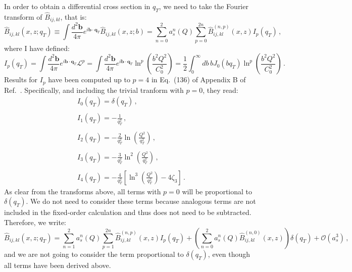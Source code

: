 \documentclass[10pt,a4paper]{article}
\begin{document}
In order to obtain a differential cross section in $q_T$, we need to
take the Fourier transform of $\hat{B}_{ij,kl}$, that is:
\begin{equation}
 \hat{B}_{ij,kl}(x,z;q_T) \equiv \int\frac{d^2\mathbf{b}}{4\pi} e^{i \mathbf{b}\cdot
  \mathbf{q}_T} \hat{B}_{ij,kl}(x,z;b) = \sum_{n=0}^2a_s^n(Q)\sum_{p=0}^{2n}\hat{B}_{ij,kl}^{(n,p)}(x,z) I_p(q_T)\,,
\end{equation}
where I have defined:
\begin{equation}
I_p(q_T) = \int\frac{d^2\mathbf{b}}{4\pi} e^{i \mathbf{b}\cdot
  \mathbf{q}_T}\mathcal{L}^p=\int\frac{d^2\mathbf{b}}{4\pi} e^{i \mathbf{b}\cdot
  \mathbf{q}_T}\ln^p\left(\frac{b^2Q^2}{C_0^2}\right) = \frac12\int_0^\infty db\,b J_0(bq_T) \ln^p\left(\frac{b^2Q^2}{C_0^2}\right)\,.
\end{equation}
Results for $I_p$ have been computed up to $p=4$ in Eq.~(136) of
Appendix B of Ref.~\cite{Bozzi:2005wk}. Specifically, and including
the trivial tranform with $p=0$, they read:
\begin{equation}
\begin{array}{l}
\displaystyle I_0(q_T) = \delta(q_T)\,,\\
\\
\displaystyle I_1(q_T) = - \frac{1}{q_T^2}\,,\\
\\
\displaystyle I_2(q_T) = - \frac{2}{q_T^2}\ln\left(\frac{Q^2}{q_T^2}\right) \,,\\
\\
\displaystyle I_3(q_T) = - \frac{3}{q_T^2}\ln^2\left(\frac{Q^2}{q_T^2}\right) \,,\\
\\
\displaystyle I_4(q_T) = - \frac{4}{q_T^2}\left[\ln^3\left(\frac{Q^2}{q_T^2}\right)-4\zeta_3\right]\,.
\end{array}
\end{equation}
As clear from the transforms above, all terms with $p=0$ will be
proportional to $\delta(q_T)$. We do not need to consider these terms
because analogous terms are not included in the fixed-order
calculation and thus does not need to be subtracted. Therefore, we write:
\begin{equation}\label{eq:finalformula}
  \hat{B}_{ij,kl}(x,z;q_T) =
  \sum_{n=1}^2a_s^n(Q)\sum_{p=1}^{2n}\hat{B}_{ij,kl}^{(n,p)}(x,z)
  I_p(q_T)+ \left(\sum_{n=0}^2a_s^n(Q)\hat{B}_{ij,kl}^{(n,0)}(x,z)\right)\delta(q_T)+\mathcal{O}(a_s^3)\,,
\end{equation}
and we are not going to consider the term proportional to
$\delta(q_T)$, even though all terms have been derived above.
\end{document}
